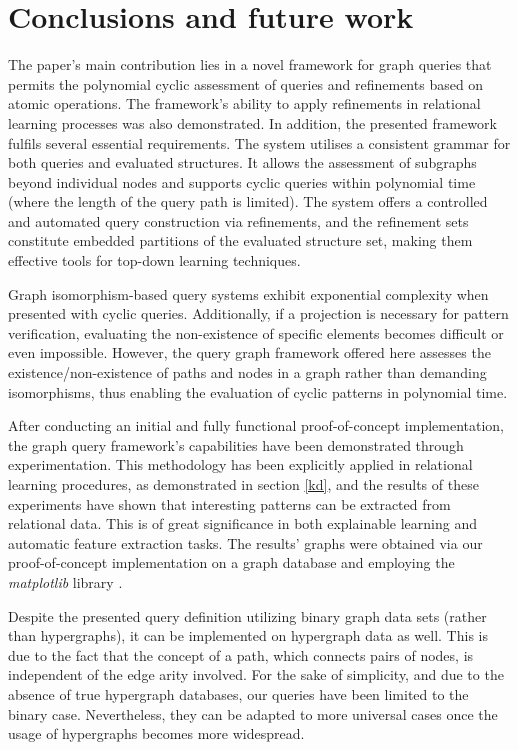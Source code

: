 \documentclass[mathematics,article,submit,pdftex,moreauthors]{Definitions/mdpi}
\begin{document}
\section{Conclusions and future work}
\label{cafw}

The paper's main contribution lies in a novel framework for graph queries that permits the polynomial cyclic assessment of queries and refinements based on atomic operations. The framework's ability to apply refinements in relational learning processes was also demonstrated. In addition, the presented framework fulfils several essential requirements. The system utilises a consistent grammar for both queries and evaluated structures. It allows the assessment of subgraphs beyond individual nodes and supports cyclic queries within polynomial time (where the length of the query path is limited). The system offers a controlled and automated query construction via refinements, and the refinement sets constitute embedded partitions of the evaluated structure set, making them effective tools for top-down learning techniques.

Graph isomorphism-based query systems exhibit exponential complexity when presented with cyclic queries. Additionally, if a projection is necessary for pattern verification, evaluating the non-existence of specific elements becomes difficult or even impossible. However, the query graph framework offered here assesses the existence/non-existence of paths and nodes in a graph rather than demanding isomorphisms, thus enabling the evaluation of cyclic patterns in polynomial time. 

After conducting an initial and fully functional proof-of-concept implementation, the graph query framework's capabilities have been demonstrated through experimentation. This methodology has been explicitly applied in relational learning procedures, as demonstrated in section \ref{kd}, and the results of these experiments have shown that interesting patterns can be extracted from relational data. This is of great significance in both explainable learning and automatic feature extraction tasks. The results' graphs were obtained via our proof-of-concept implementation on a graph database and employing the \textit{matplotlib} library \citep{hunter}.

Despite the presented query definition utilizing binary graph data sets (rather than hypergraphs), it can be implemented on hypergraph data as well. This is due to the fact that the concept of a path, which connects pairs of nodes, is independent of the edge arity involved. For the sake of simplicity, and due to the absence of true hypergraph databases, our queries have been limited to the binary case. Nevertheless, they can be adapted to more universal cases once the usage of hypergraphs becomes more widespread.
\end{document}
